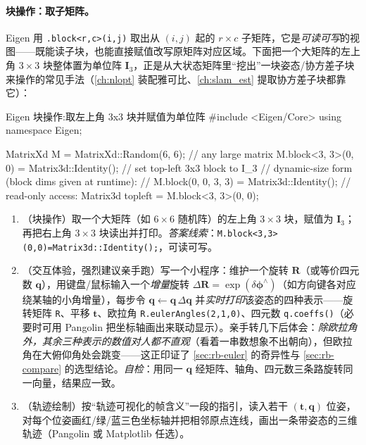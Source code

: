 \paragraph{块操作：取子矩阵。}Eigen 用 \texttt{.\allowbreak block<r,c>(i,j)} 取出从 $(i,j)$ 起的 $r\times c$ 子矩阵，它是\emph{可读可写}的视图——既能读子块，也能直接赋值改写原矩阵对应区域。下面把一个大矩阵的左上角 $3\times3$ 块整体置为单位阵 $\mathbf{I}_3$，正是从大状态矩阵里“挖出”一块姿态/协方差子块来操作的常见手法（\cref{ch:nlopt} 装配雅可比、\cref{ch:slam_est} 提取协方差子块都靠它）：
\begin{codebox}[C++]{Eigen 块操作:取左上角 3x3 块并赋值为单位阵}
#include <Eigen/Core>
using namespace Eigen;

MatrixXd M = MatrixXd::Random(6, 6);          // any large matrix
M.block<3, 3>(0, 0) = Matrix3d::Identity();   // set top-left 3x3 block to I_3
// dynamic-size form (block dims given at runtime):
// M.block(0, 0, 3, 3) = Matrix3d::Identity();
// read-only access: Matrix3d topleft = M.block<3, 3>(0, 0);
\end{codebox}

\begin{practice}
\begin{enumerate}
  \item （块操作）取一个大矩阵（如 $6\times6$ 随机阵）的左上角 $3\times3$ 块，赋值为 $\mathbf{I}_3$；再把右上角 $3\times3$ 块读出并打印。\emph{答案线索}：\texttt{M.\allowbreak block<3,3>(0,0)=Matrix3d::Identity();}，可读可写。
  \item （交互体验，强烈建议亲手跑）写一个小程序：维护一个旋转 $\mathbf{R}$（或等价四元数 $\mathbf{q}$），用键盘/鼠标输入一个\emph{增量}旋转 $\Delta\mathbf{R}=\exp(\delta\boldsymbol{\phi}^\wedge)$（如方向键各对应绕某轴的小角增量），每步令 $\mathbf{q}\leftarrow\mathbf{q}\,\Delta\mathbf{q}$ 并\emph{实时打印}该姿态的四种表示——旋转矩阵 \texttt{R}、平移 $\mathbf{t}$、欧拉角 \texttt{R.\allowbreak eulerAngles(2,1,0)}、四元数 \texttt{q.coeffs()}（必要时可用 Pangolin 把坐标轴画出来联动显示）。亲手转几下后体会：\emph{除欧拉角外，其余三种表示的数值对人都不直观}（看着一串数想象不出朝向），但欧拉角在大俯仰角处会跳变——这正印证了 \cref{sec:rb-euler} 的奇异性与 \cref{sec:rb-compare} 的选型结论。\emph{自检}：用同一 $\mathbf{q}$ 经矩阵、轴角、四元数三条路旋转同一向量，结果应一致。
  \item （轨迹绘制）按“轨迹可视化的帧含义”一段的指引，读入若干 $(\mathbf{t},\mathbf{q})$ 位姿，对每个位姿画红/绿/蓝三色坐标轴并把相邻原点连线，画出一条带姿态的三维轨迹（Pangolin 或 Matplotlib 任选）。
\end{enumerate}
\end{practice}

